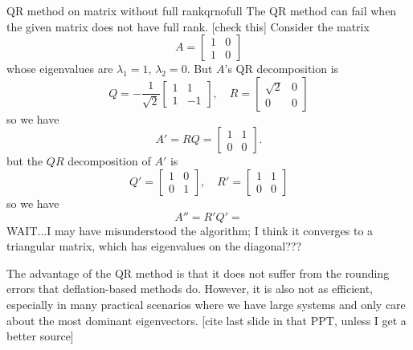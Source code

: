 \documentclass{article}
\begin{document}
\begin{example}{QR method on matrix without full rank}{qrnofull}
  The QR method can fail when the given matrix does not have full rank. [check this] Consider the matrix
  \begin{equation*}
    A = \begin{bmatrix}1 & 0 \\ 1 & 0\end{bmatrix}
  \end{equation*}
  whose eigenvalues are $\lambda_1 = 1$, $\lambda_2 = 0$. But $A$'s QR decomposition is
  \begin{equation*}
    Q = -\frac{1}{\sqrt{2}}\begin{bmatrix}1 & 1 \\ 1 & -1\end{bmatrix}, \quad
    R = \begin{bmatrix}\sqrt{2} & 0 \\ 0 & 0\end{bmatrix}
  \end{equation*}
  so we have
  \begin{equation*}
    A' = RQ = \begin{bmatrix}1 & 1 \\ 0 & 0\end{bmatrix}.
  \end{equation*}
  but the $QR$ decomposition of $A'$ is
  \begin{equation*}
    Q' = \begin{bmatrix}1 & 0 \\ 0 & 1\end{bmatrix}, \quad
    R' = \begin{bmatrix}1 & 1 \\ 0 & 0\end{bmatrix}
  \end{equation*}
  so we have
  \begin{equation*}
    A'' = R'Q' = 
  \end{equation*}
  WAIT...I may have misunderstood the algorithm; I think it converges to a triangular matrix, which has eigenvalues on the diagonal???
\end{example}

The advantage of the QR method is that it does not suffer from the rounding errors that deflation-based methods do. However, it is also not as efficient, especially in many practical scenarios where we have large systems and only care about the most dominant eigenvectors. [cite last slide in that PPT, unless I get a better source]
\end{document}
